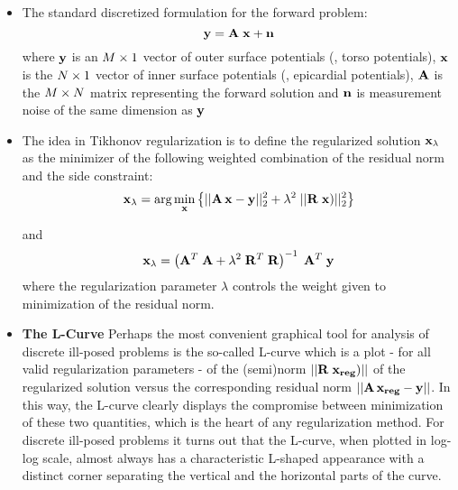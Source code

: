 \begin{itemize}
  \item The standard discretized formulation for the forward problem:
        \begin{equation}
          \label{Eqn:prob}
          {\bf y} = {\bf A \; x} + {\bf n}
        \end{equation}
      where ${\bf y}$ is an $M\x1$ vector of outer surface potentials (\eg,
      torso potentials), ${\bf x}$ is the $N\x1$ vector of inner surface
      potentials (\eg, epicardial potentials), ${\bf A}$ is the $M\x N$
      matrix representing the forward solution and ${\bf n}$ is measurement
      noise of the same dimension as ${\bf y}$ 
             
  \item The idea in Tikhonov regularization is to define the regularized
        solution 
        ${\bf x}_{\lambda}$ as the minimizer of the following weighted
        combination 
        of the residual norm and the side constraint:  
        \begin{equation}
          {\bf x}_{\lambda} = \mbox{arg}\min_{{\bf x}}\left\{ ||{\bf A\,x}-{\bf
          y}||_{2}^{2} + \lambda^{2}\;||{\bf R\;x})||_{2}^{2}\right\}
        \end{equation}
      
      and          
        \begin{equation}         
          {\bf x}_{\lambda} = \left( {\bf A}^{T}\;{\bf A} + \lambda^{2}\;{\bf
          R}^{T}\;{\bf R}\right)^{-1}\; {\bf A}^{T}\;{\bf y}
        \end{equation}
      where the regularization parameter $\lambda$ controls the weight given to
      minimization of the residual norm. 
\end{itemize}         

\label{Sec:regpar}

\begin{itemize}
  \item {\bf The L-Curve}
        Perhaps the most convenient graphical tool for analysis of discrete
        ill-posed problems is the so-called L-curve which is a plot - for
        all valid regularization parameters - of the (semi)norm $||{\bf
        R\;x_{reg}})||$ of the regularized solution versus the
        corresponding residual norm $||{\bf A\,x_{reg}}-{\bf y}||$. In this
        way, the L-curve clearly displays the compromise between
        minimization of these two quantities, which is the heart of any
        regularization method. For discrete ill-posed problems it turns out
        that the L-curve, when plotted in log-log scale, almost always has
        a characteristic L-shaped appearance with a distinct corner
        separating the vertical and the horizontal parts of the curve.
        
\end{itemize}
             
